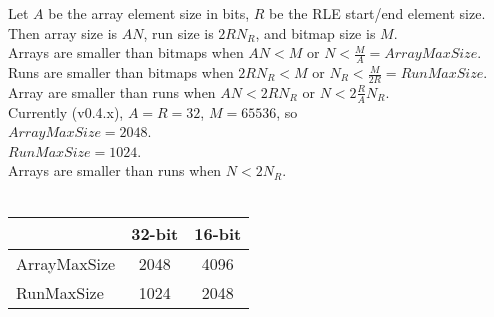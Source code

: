 \documentclass{article} %
\begin{document}
\bigskip


Let $A$ be the array element size in bits, $R$ be the RLE start/end element size. Then array size is $AN$, run size is
$2RN_R$, and bitmap size is $M$.\\

Arrays are smaller than bitmaps when $AN < M$ or $N < \frac{M}{A} = ArrayMaxSize$.\\
Runs are smaller than bitmaps when $2RN_R < M$ or $N_R < \frac{M}{2R} = RunMaxSize$.\\
Array are smaller than runs when $AN < 2RN_R$ or $N < 2\frac{R}{A} N_R$.\\

Currently (v0.4.x), $A = R = 32$, $M = 65536$, so\\ 

$ArrayMaxSize = 2048$.\\
$RunMaxSize = 1024$.\\
Arrays are smaller than runs when $N < 2 N_R$.\\
\\
\begin{tabular}{l | c | c}
    & 32-bit & 16-bit \\
  \hline
  ArrayMaxSize & 2048 & 4096 \\
  \hline
  RunMaxSize & 1024 & 2048 \\
\end{tabular}
\end{document}
